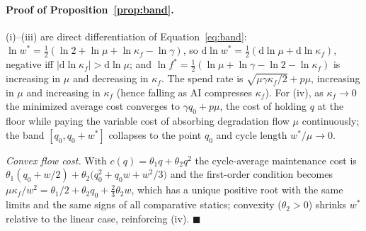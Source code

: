 
\paragraph{Proof of Proposition~\ref{prop:band}.}
(i)--(iii) are direct differentiation of Equation~\eqref{eq:band}:
$\ln w^* = \tfrac12(\ln 2 + \ln\mu + \ln\kappa_f - \ln\gamma)$, so
$\mathrm{d}\ln w^* = \tfrac12(\mathrm{d}\ln\mu + \mathrm{d}\ln\kappa_f)$,
negative iff $|\mathrm{d}\ln\kappa_f| > \mathrm{d}\ln\mu$; and
$\ln f^* = \tfrac12(\ln\mu + \ln\gamma - \ln 2 - \ln\kappa_f)$ is
increasing in $\mu$ and decreasing in $\kappa_f$. The spend rate is
$\sqrt{\mu\gamma\kappa_f/2} + p\mu$, increasing in $\mu$ and increasing in
$\kappa_f$ (hence falling as AI compresses $\kappa_f$). For (iv), as
$\kappa_f \to 0$ the minimized average cost converges to
$\gamma q_0 + p\mu$, the cost of holding $q$ at the floor while paying the
variable cost of absorbing degradation flow $\mu$ continuously; the band
$[q_0, q_0 + w^*]$ collapses to the point $q_0$ and cycle length
$w^*/\mu \to 0$.

\emph{Convex flow cost.} With $c(q) = \theta_1 q + \theta_2 q^2$ the
cycle-average maintenance cost is
$\theta_1(q_0 + w/2) + \theta_2\big(q_0^2 + q_0 w + w^2/3\big)$ and the
first-order condition becomes
$\mu\kappa_f / w^2 = \theta_1/2 + \theta_2 q_0 + \tfrac{2}{3}\theta_2 w$,
which has a unique positive root with the same limits and the same signs
of all comparative statics; convexity ($\theta_2 > 0$) shrinks $w^*$
relative to the linear case, reinforcing (iv).
\hfill$\blacksquare$

